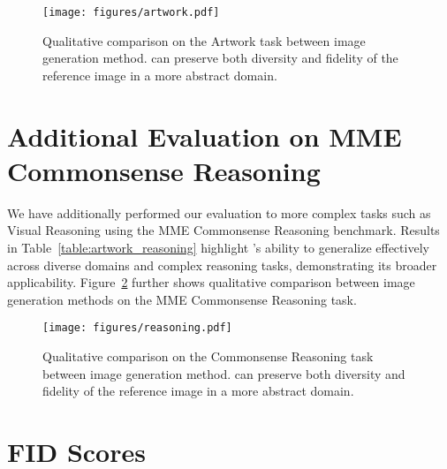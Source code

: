 

\begin{figure}[!h]
    \centering
    \texttt{[image: figures/artwork.pdf]}
    \caption{Qualitative comparison on the Artwork task between image generation method. \method can preserve both diversity and fidelity of the reference image in a more abstract domain.}
    \label{fig:artwork}
\end{figure}


\section{Additional Evaluation on MME Commonsense Reasoning}
We have additionally performed our evaluation to more complex tasks such as Visual Reasoning using the MME Commonsense Reasoning benchmark. Results in Table~\ref{table:artwork_reasoning} highlight \method's ability to generalize effectively across diverse domains and complex reasoning tasks, demonstrating its broader applicability. Figure~\ref{fig:reasoning} further shows qualitative comparison between image generation methods on the MME Commonsense Reasoning task.

\begin{figure}[!h]
    \centering
    \texttt{[image: figures/reasoning.pdf]}
    \caption{Qualitative comparison on the Commonsense Reasoning task between image generation method. \method can preserve both diversity and fidelity of the reference image in a more abstract domain.}
    \label{fig:reasoning}
\end{figure}
\section{FID Scores}

